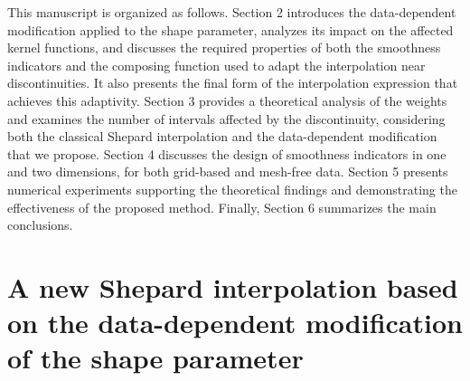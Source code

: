 \documentclass[preprint]{elsarticle}       %
\begin{document}
This manuscript is organized as follows. Section 2 introduces the data-dependent modification applied to the shape parameter, analyzes its impact on the affected kernel functions, and discusses the required properties of both the smoothness indicators and the composing function used to adapt the interpolation near discontinuities. It also presents the final form of the interpolation expression that achieves this adaptivity. Section 3 provides a theoretical analysis of the weights and examines the number of intervals affected by the discontinuity, considering both the classical Shepard interpolation and the data-dependent modification that we propose. Section 4 discusses the design of smoothness indicators in one and two dimensions, for both grid-based and mesh-free data. Section 5 presents numerical experiments supporting the theoretical findings and demonstrating the effectiveness of the proposed method. Finally, Section 6 summarizes the main conclusions.





\section{A new Shepard interpolation based on the data-dependent modification of the shape parameter}
\end{document}
